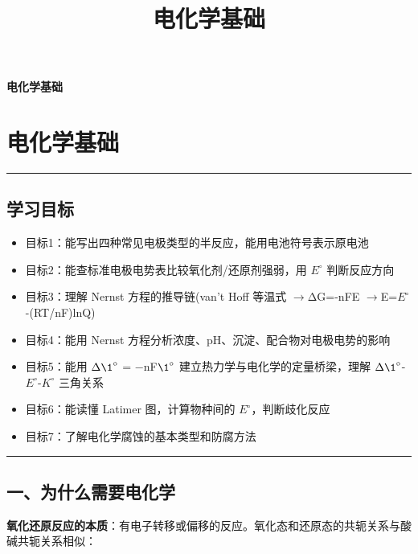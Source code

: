 \documentclass[a4paper,11pt]{ctexart}
\title{电化学基础}
\date{}
\providecommand{\tightlist}{\setlength{\itemsep}{0pt}\setlength{\parskip}{0pt}}
\newcommand{\箭}{\ensuremath{\rightarrow}}
\newcommand{\左箭}{\ensuremath{\leftarrow}}
\newcommand{\上箭}{\ensuremath{\uparrow}}
\newcommand{\下箭}{\ensuremath{\downarrow}}
\newcommand{\衡}{\ensuremath{\rightleftharpoons}}
\newcommand{\双箭}{\ensuremath{\leftrightarrow}}
\newcommand{\约等于}{\ensuremath{\approx}}
\newcommand{\小于等于}{\ensuremath{\leq}}
\newcommand{\大于等于}{\ensuremath{\geq}}
\newcommand{\不等于}{\ensuremath{\neq}}
\newcommand{\西格马}{\ensuremath{\sigma}}
\newcommand{\派}{\ensuremath{\pi}}
\begin{document}
\thispagestyle{plain}
\begin{center}
{\bfseries 电化学基础\par}
\end{center}
\vspace{1em}
\section{电化学基础}\label{ux7535ux5316ux5b66ux57faux7840}

\begin{center}\rule{0.5\linewidth}{0.5pt}\end{center}

\subsection{学习目标}\label{ux5b66ux4e60ux76eeux6807}

\begin{itemize}
\tightlist
\item
  目标1：能写出四种常见电极类型的半反应，能用电池符号表示原电池
\item
  目标2：能查标准电极电势表比较氧化剂/还原剂强弱，用 \(E^{\circ}\) 判断反应方向
\item
  目标3：理解 Nernst 方程的推导链(van't Hoff 等温式 \箭 ΔG=-nFE \箭 E=\(E^{\circ}\)-(RT/nF)lnQ)
\item
  目标4：能用 Nernst 方程分析浓度、pH、沉淀、配合物对电极电势的影响
\item
  目标5：能用 \(\Delta \1^{\circ}\) = −nF\(\1^{\circ}\) 建立热力学与电化学的定量桥梁，理解 \(\Delta \1^{\circ}\)-\(E^{\circ}\)-\(K^{\circ}\) 三角关系
\item
  目标6：能读懂 Latimer 图，计算物种间的 \(E^{\circ}\)，判断歧化反应
\item
  目标7：了解电化学腐蚀的基本类型和防腐方法
\end{itemize}

\begin{center}\rule{0.5\linewidth}{0.5pt}\end{center}

\subsection{一、为什么需要电化学}\label{ux4e00ux4e3aux4ec0ux4e48ux9700ux8981ux7535ux5316ux5b66}

\textbf{氧化还原反应的本质}：有电子转移或偏移的反应。氧化态和还原态的共轭关系与酸碱共轭关系相似：
\end{document}
